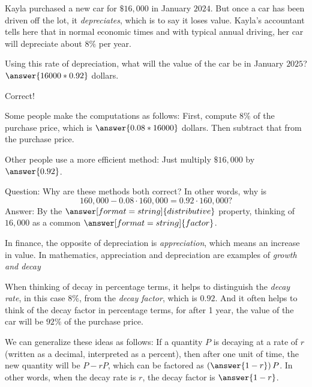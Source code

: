 \documentclass[nooutcomes]{ximera}
\begin{document}
\begin{problem}
Kayla purchased a new car for $\$16,\!000$ in January $2024$.  But once a car has been driven off the lot, it \emph{depreciates}, which is to say it loses value.  Kayla's accountant tells here that in normal economic times and with typical annual driving, her car will depreciate about $8\%$ per year.  

Using this rate of depreciation, what will the value of the car be in January $2025$?  $\answer{16000*0.92}$ dollars.  
\begin{problem}
Correct!  

Some people make the computations as follows:  First, compute $8\%$ of the purchase price, which is $\answer{0.08*16000}$ dollars.  Then subtract that from the purchase price.  

Other people use a more efficient method:  Just multiply $\$16,\!000$ by $\answer{0.92}$.  

\begin{problem}
Question: Why are these methods both correct?  In other words, why is  
\[
160,\!000 - 0.08\cdot 160,\!000 = 0.92 \cdot 160,\!000?  
\]
Answer: By the $\answer[format=string]{distributive}$ property, thinking of $16,\!000$ as a common $\answer[format=string]{factor}$. 

\begin{problem}
In finance, the opposite of depreciation is \emph{appreciation}, which means an increase in value.  In mathematics, appreciation and depreciation are examples of \emph{growth and decay}
 
When thinking of decay in percentage terms, it helps to distinguish the \emph{decay rate}, in this case $8\%$, from the 
\emph{decay factor}, which is $0.92$.  And it often helps to think of the decay factor in percentage terms, for after 1 year, 
the value of the car will be $92\%$ of the purchase price.  

We can generalize these ideas as follows:  If a quantity $P$ is decaying at a rate of $r$ (written as a decimal, interpreted as a percent), then after one unit of time, the 
new quantity will be $P - rP$, which can be factored as $\left(\answer{1-r}\right)P$.  In other words, when the decay rate is $r$, the decay factor is $\answer{1-r}$.  

\end{problem}
\end{problem}
\end{problem}
\end{problem}
\end{document}
